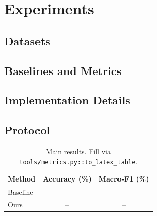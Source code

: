 \section{Experiments}
\label{sec:experiments}

\subsection{Datasets}

\subsection{Baselines and Metrics}

\subsection{Implementation Details}

\subsection{Protocol}

\begin{table}[t]
  \centering
  \caption{Main results. Fill via \texttt{tools/metrics.py::to\_latex\_table}.}
  \label{tab:main_results}
  \begin{tabular}{lcc}
    \toprule
    Method & Accuracy (\%) & Macro-F1 (\%) \\
    \midrule
    Baseline & -- & -- \\
    Ours     & -- & -- \\
    \bottomrule
  \end{tabular}
\end{table}
